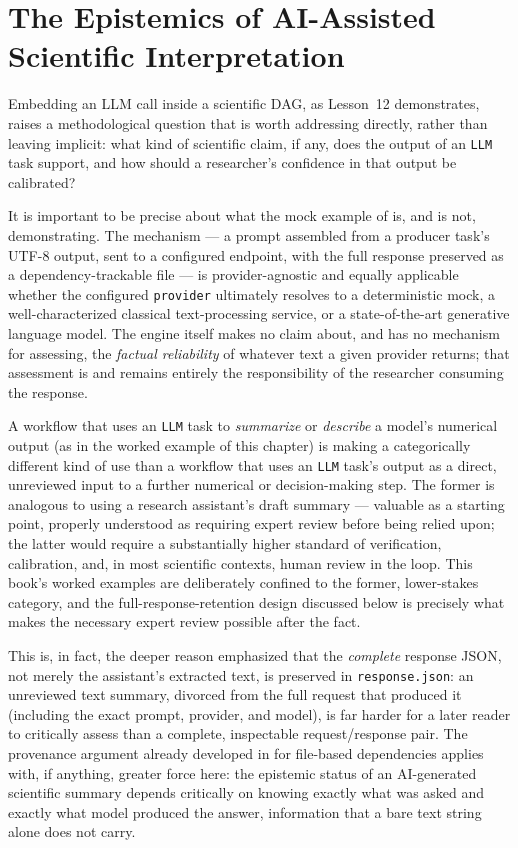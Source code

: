 \section{The Epistemics of AI-Assisted Scientific Interpretation}

Embedding an LLM call inside a scientific DAG, as Lesson~12 demonstrates,
raises a methodological question that is worth addressing directly, rather
than leaving implicit: what kind of scientific claim, if any, does the
output of an \texttt{LLM} task support, and how should a researcher's
confidence in that output be calibrated?

It is important to be precise about what the mock example of
 is, and is not, demonstrating. The mechanism --- a
prompt assembled from a producer task's UTF-8 output, sent to a configured
endpoint, with the full response preserved as a dependency-trackable file
--- is provider-agnostic and equally applicable whether the configured
\texttt{provider} ultimately resolves to a deterministic mock, a
well-characterized classical text-processing service, or a state-of-the-art
generative language model. The engine itself makes no claim about, and has
no mechanism for assessing, the \emph{factual reliability} of whatever text
a given provider returns; that assessment is and remains entirely the
responsibility of the researcher consuming the response.

\begin{cautionbox}
A workflow that uses an \texttt{LLM} task to \emph{summarize} or
\emph{describe} a model's numerical output (as in the worked example of
this chapter) is making a categorically different kind of use than a
workflow that uses an \texttt{LLM} task's output as a direct, unreviewed
input to a further numerical or decision-making step. The former is
analogous to using a research assistant's draft summary --- valuable as a
starting point, properly understood as requiring expert review before being
relied upon; the latter would require a substantially higher standard of
verification, calibration, and, in most scientific contexts, human review
in the loop. This book's worked examples are deliberately confined to the
former, lower-stakes category, and the full-response-retention design
discussed below is precisely what makes the necessary expert review
possible after the fact.
\end{cautionbox}

This is, in fact, the deeper reason  emphasized that the
\emph{complete} response JSON, not merely the assistant's extracted text, is
preserved in \texttt{response.json}: an unreviewed text summary, divorced
from the full request that produced it (including the exact prompt,
provider, and model), is far harder for a later reader to critically assess
than a complete, inspectable request/response pair. The provenance argument
already developed in  for file-based dependencies applies
with, if anything, greater force here: the epistemic status of an
AI-generated scientific summary depends critically on knowing exactly what
was asked and exactly what model produced the answer, information that a
bare text string alone does not carry.


